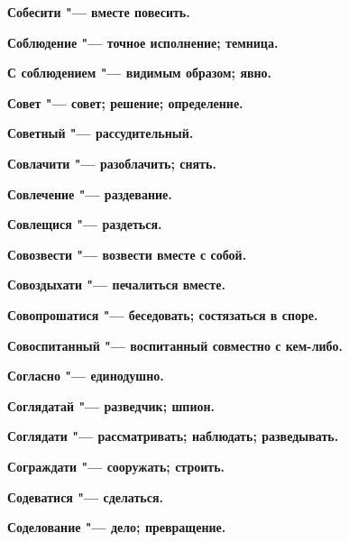 \begin{multicols}{2}
\bfseries Собесити\normalfont{} "--- вместе повесить. 




\bfseries Соблюдение\normalfont{} "--- точное исполнение; темница. 




\bfseries С соблюдением\normalfont{} "--- видимым образом; явно. 




\bfseries Совет\normalfont{} "--- совет; решение; определение. 




\bfseries Советный\normalfont{} "--- рассудительный. 




\bfseries Совлачити\normalfont{} "--- разоблачить; снять. 




\bfseries Совлечение\normalfont{} "--- раздевание. 




\bfseries Совлещися\normalfont{} "--- раздеться. 




\bfseries Совозвести\normalfont{} "--- возвести вместе с собой. 




\bfseries Совоздыхати\normalfont{} "--- печалиться вместе. 




\bfseries Совопрошатися\normalfont{} "--- беседовать; состязаться в споре. 




\bfseries Совоспитанный\normalfont{} "--- воспитанный совместно с кем-либо. 




\bfseries Согласно\normalfont{} "--- единодушно. 




\bfseries Соглядатай\normalfont{} "--- разведчик; шпион. 




\bfseries Соглядати\normalfont{} "--- рассматривать; наблюдать; разведывать. 




\bfseries Сограждати\normalfont{} "--- сооружать; строить. 




\bfseries Содеватися\normalfont{} "--- сделаться. 




\bfseries Соделование\normalfont{} "--- дело; превращение. 





\end{multicols}
